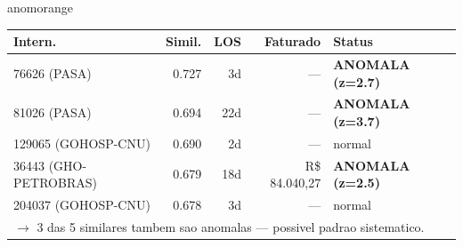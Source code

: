 \documentclass[a4paper,10pt]{article}
\begin{document}
\begin{anomalycard}[Internacao 161824 | GHO-PETROBRAS | ALTO (z=4.96)]{anomorange}
\begin{tabular}{l r r r l}\toprule\textbf{Intern.} & \textbf{Simil.} & \textbf{LOS} & \textbf{Faturado} & \textbf{Status} \\\midrule
76626 (PASA) & 0.727 & 3d & --- & \textcolor{anomred}{\textbf{ANOMALA (z=2.7)}} \\
81026 (PASA) & 0.694 & 22d & --- & \textcolor{anomred}{\textbf{ANOMALA (z=3.7)}} \\
129065 (GOHOSP-CNU) & 0.690 & 2d & --- & \textcolor{jcubeblue}{normal} \\
36443 (GHO-PETROBRAS) & 0.679 & 18d & R\$ 84.040,27 & \textcolor{anomred}{\textbf{ANOMALA (z=2.5)}} \\
204037 (GOHOSP-CNU) & 0.678 & 3d & --- & \textcolor{jcubeblue}{normal} \\
\multicolumn{5}{l}{\textcolor{anomred}{\small $\rightarrow$ 3 das 5 similares tambem sao anomalas --- possivel padrao sistematico.}} \\
\bottomrule\end{tabular}



\end{anomalycard}

\newpage
\end{document}
